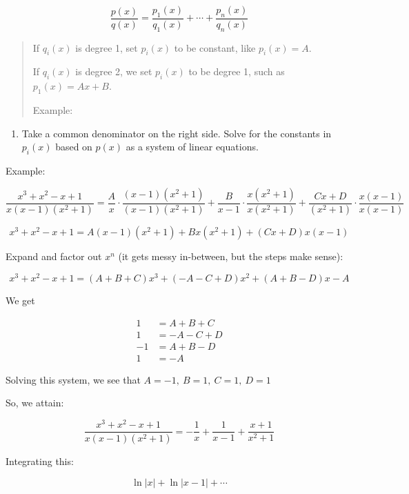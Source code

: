 \documentclass[12pt]{article}
\theoremstyle{plain}
\theoremstyle{remark}
\theoremstyle{definition}
\begin{document}
\[\frac{p(x)}{q(x)} = \frac{p_{1}(x)}{q_{1}(x)} + \cdots + \frac{p_{n}(x)}{q_{n}(x)}\]

\begin{quote}
If \(q_{i}(x)\) is degree 1, set \(p_{i}(x)\) to be constant, like
\(p_{i}(x) = A\).

If \(q_{i}(x)\) is degree 2, we set \(p_{i}(x)\) to be degree 1, such as
\(p_{1}(x) = Ax + B\).

Example:

\end{quote}

\begin{enumerate}
\def\labelenumi{\arabic{enumi}.}
\setcounter{enumi}{2}
\item
  Take a common denominator on the right side. Solve for the constants
  in \(p_{i}(x)\) based on \(p(x)\) as a system of linear equations.
\end{enumerate}

Example:

\[\frac{x^{3} + x^{2} - x + 1}{x(x - 1)\left( x^{2} + 1 \right)} = \frac{A}{x} \cdot \frac{(x - 1)\left( x^{2} + 1 \right)}{(x - 1)\left( x^{2} + 1 \right)} + \frac{B}{x - 1} \cdot \frac{x\left( x^{2} + 1 \right)}{x\left( x^{2} + 1 \right)} + \frac{Cx + D}{\left( x^{2} + 1 \right)} \cdot \frac{x(x - 1)}{x(x - 1)}\]

\[x^{3} + x^{2} - x + 1 = A(x - 1)\left( x^{2} + 1 \right) + Bx\left( x^{2} + 1 \right) + (Cx + D)x(x - 1)\]

Expand and factor out \(x^{n}\) (it gets messy in-between, but the steps
make sense):

\[x^{3} + x^{2} - x + 1 = (A + B + C)x^{3} + ( - A - C + D)x^{2} + (A + B - D)x - A\]

We get

\begin{align*}
1 &= A + B + C \\
1 &= - A - C + D \\
- 1 &= A + B - D \\
1 &= - A
\end{align*}


Solving this system, we see that \(A = - 1,\ B = 1,\ C = 1,\ D = 1\)

So, we attain:

\[\frac{x^{3} + x^{2} - x + 1}{x(x - 1)\left( x^{2} + 1 \right)} = - \frac{1}{x} + \frac{1}{x - 1} + \frac{x + 1}{x^{2} + 1}\]


Integrating this:

\[\ln|x| + \ln|x - 1| + \cdots\]
\end{document}
